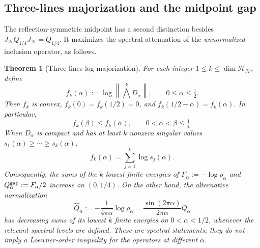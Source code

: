 \documentclass[a4paper,11pt]{article}
\newtheorem{theorem}{Theorem}
\theoremstyle{definition}
\newcommand{\mN}{\mathcal{N}}
\newcommand{\mH}{\mathcal{H}}
\begin{document}
\subsection{Three-lines majorization and the midpoint gap}
\label{subsec:Q-three-lines}

The reflection-symmetric midpoint has a second distinction besides
$J_\mN Q_{1/4}J_\mN=Q_{1/4}$. It maximizes the spectral
attenuation of the \emph{unnormalized} inclusion operator, as follows.

\begin{theorem}[Three-lines log-majorization]
\label{thm:Q-three-lines}
For each integer $1\leq k\leq\dim\mH_{\mN}$, define
\begin{equation}
 f_k(\alpha)
 :=\log\left\|\bigwedge^kD_\alpha\right\|,
 \qquad 0\leq\alpha\leq\tfrac12.
 \label{eq:Q-fk-definition}
\end{equation}
Then $f_k$ is convex, $f_k(0)=f_k(1/2)=0$, and
$f_k(1/2-\alpha)=f_k(\alpha)$. In particular,
\begin{equation}
 \boxed{f_k(\beta)\leq f_k(\alpha),
 \qquad 0<\alpha<\beta\leq\tfrac14.}
 \label{eq:Q-fk-monotone}
\end{equation}
When $D_\alpha$ is compact and has at least $k$ nonzero singular
values $s_1(\alpha)\geq\cdots\geq s_k(\alpha)$,
\begin{equation}
 f_k(\alpha)=\sum_{j=1}^k\log s_j(\alpha).
\end{equation}
Consequently, the sums of the $k$ lowest finite energies of
$F_\alpha:=-\log\rho_\alpha$ and
$Q_\alpha^{\rm gap}:=F_\alpha/2$ increase on $(0,1/4)$.
On the other hand, the alternative normalization
\begin{equation}
 \widehat Q_\alpha:=-\frac{1}{4\pi\alpha}\log\rho_\alpha
 =\frac{\sin(2\pi\alpha)}{2\pi\alpha}Q_\alpha
 \label{eq:Q-alpha-linear-normalization}
\end{equation}
has \emph{decreasing} sums of its lowest $k$ finite energies on
$0<\alpha<1/2$, whenever the relevant spectral levels are defined.
These are spectral statements; they do not imply a Loewner-order
inequality for the operators at different $\alpha$.
\end{theorem}
\end{document}
